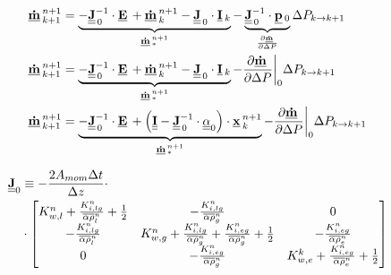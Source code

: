  \begin{align}
 \vec{\dot{m}}^{n+1}_{k+1} & =
 \underbrace{-\mat{J}_{\,0}^{-1}\cdot \vec{E} + \vec{\dot{m}}^{n+1}_{k} - \mat{J}_{\,0}\cdot \vec{I}_{k}}_{\vec{\dot{m}}^{n+1}_{*}} - \underbrace{\mat{J}_{\,0}^{-1} \cdot \vec{p}_{0}}_{\frac{\partial \vec{\dot{m}}}{\partial \Delta P}} \Delta P_{k \rightarrow k+1} \\
 \vec{\dot{m}}^{n+1}_{k+1} & =
 \underbrace{-\mat{J}_{\,0}^{-1}\cdot \vec{E} + \vec{\dot{m}}^{n+1}_{k} - \mat{J}_{\,0}\cdot \vec{I}_{k}}_{\vec{\dot{m}}^{n+1}_{*}} - \frac{\partial \vec{\dot{m}}}{\partial \Delta P}\bigg|_{0} \Delta P_{k \rightarrow k+1} \\
 \vec{\dot{m}}^{n+1}_{k+1} & =
 \underbrace{-\mat{J}_{\,0}^{-1}\cdot \vec{E} + \left(\mat{I} - \mat{J}^{-1}_{\,0}\cdot \mat{\alpha}_{0}\right)\cdot\vec{x}^{n+1}_{k}}_{\vec{\dot{m}}^{n+1}_{*}} - \frac{\partial \vec{\dot{m}}}{\partial \Delta P}\bigg|_{0} \Delta P_{k \rightarrow k+1}
\end{align}


 \begin{align}
 \Mat{J}_{0} & \equiv -\frac{2 A_{mom}\Delta t}{\Delta z}\cdot \nonumber \\
 &\cdot \begin{bmatrix} 
 K^{n}_{w,l} + \frac{K^{n}_{i,lg}}{\Ave{\alpha\rho}^{n}_{l}} +\frac{1}{2} &  -\frac{K^{n}_{i,lg}}{\Ave{\alpha\rho}^{n}_{g}} & 0\\
 -\frac{K^{n}_{i,lg}}{\Ave{\alpha\rho}^{n}_{l}} &  K^{n}_{w,g} + \frac{K^{n}_{i,lg}}{\Ave{\alpha\rho}^{n}_{g}}+\frac{K^{n}_{i,eg}}{\Ave{\alpha\rho}^{n}_{g}} +\frac{1}{2} & -\frac{K^{n}_{i,eg}}{\Ave{\alpha\rho}^{n}_{e}}\\
 0 & -\frac{K^{n}_{i,eg}}{\Ave{\alpha\rho}^{n}_{g}} &  K^{k}_{w,e} + \frac{K^{n}_{i,eg}}{\Ave{\alpha\rho}^{n}_{e}}+\frac{1}{2}\\
 \end{bmatrix}
 \end{align}

